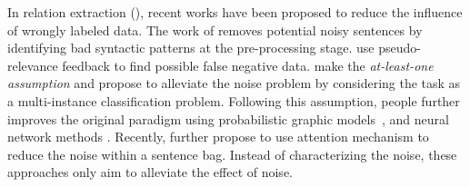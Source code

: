 In relation extraction (\RE), recent works  have been proposed to reduce the influence of wrongly labeled data.
The work of \cite{takamatsu2012reducing} removes potential noisy sentences by identifying bad syntactic
patterns at the pre-processing stage. \cite{xu2013filling} use pseudo-relevance feedback to find
possible false negative data. 
\cite{riedel2010modeling} make the \emph{at-least-one assumption} 
and 
propose to alleviate the noise problem by considering the \RE task as a multi-instance classification problem.
Following this assumption, people further improves the original paradigm using probabilistic graphic models~\cite{hoffmann2011knowledge,surdeanu2012multi}, and neural network methods \cite{zeng2015distant}. 
Recently, \cite{lin2016neural} further propose to use attention mechanism to reduce the noise within a sentence bag. 
Instead of characterizing the noise, these approaches only aim to alleviate the effect of noise. %
%


